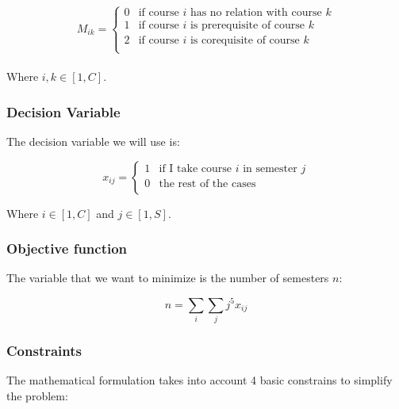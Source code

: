 \documentclass[journal]{IEEEtran}
\begin{document}
\[ M_{ik} = 
    \begin{cases} 
      0 & \textrm{if course $i$ has no relation with course $k$} \\          
      1 & \textrm{if course $i$ is prerequisite of course $k$} \\   
      2 & \textrm{if course $i$ is corequisite of course $k$} \\  
    \end{cases}
\]\\

Where $i,k \in [1,C]$.\\

\subsubsection{Decision Variable}
The decision variable we will use is:

\[ x_{ij} = 
    \begin{cases} 
      1 & \textrm{if I take course $i$ in semester $j$} \\   
      0 & \textrm{the rest of the cases} \\  
    \end{cases}
\]

Where $i \in [1,C]$ and $j \in [1,S]$. \\

\subsubsection{Objective function}
The variable that we want to minimize is the number of semesters $n$:

\begin{equation}
\label{objectiveFunction}
n = \displaystyle\sum_{i}\sum_{j} j^5 x_{ij}
\end{equation}

\subsubsection{Constraints}
The mathematical formulation takes into account 4 basic constrains to simplify the problem:\\
\end{document}

